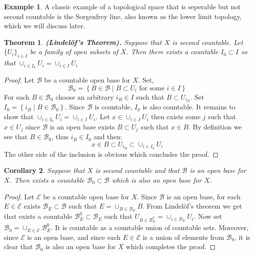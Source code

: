 \documentclass[11pt,a4paper]{article}
\theoremstyle{definition}
\newtheorem{example}{Example}[section]
\theoremstyle{plain}
\newtheorem{theorem}{Theorem}[section]
\newtheorem{corollary}[theorem]{Corollary}
\newcommand{\set}[2]{ \left\{ #1 \mid #2 \right\} }
\renewcommand{\tt}[1]{\textnormal{\textbf{(#1).}}} %
\begin{document}
  \begin{example}
    A classic example of a topological space that is seperable but not
    second countable is the Sorgenfrey line, also known as the lower
    limit topology, which we will discuss later.
  \end{example}

  \begin{theorem}
    \tt{Lindelöf’s Theorem} Suppose that $X$ is second countable. Let
    $\{U_i\}_{i \in I}$ be a family of open subsets of $X$. Then there
    exists a countable $I_0 \subset I$ so that 
    $\cup_{i \in I_{0}}{U_i} = \cup_{i \in I}{U_i}$
  \end{theorem}
  \begin{proof}
    Let $\mathcal{B}$ be a countable open base for $X$. Set,
    \[
      \mathcal{B}_0 = \set{B \in \mathcal{B}}{B \subset U_i
      \text{ for some } i \in I}
    \]
    For each $B \in \mathcal{B}_0$ choose an arbitrary $i_B \in I$ such
    that $B \subset U_{i_B}$. Set $I_0 = \set{i_B}{B \in \mathcal{B}_0}$.
    Since $\mathcal{B}$ is countable, $I_0$ is also countable. It remains
    to show that $\cup_{i \in I_{0}}{U_i} = \cup_{i \in I}{U_i}$. Let
    $x \in \cup_{i \in I}{U_i}$ then exists some $j$ such that $x \in U_j$
    since $\mathcal{B}$ is an open base exists $B \subset U_j$ such that
    $x \in B$. By definition we see that $B \in \mathcal{B}_0$, thus
    $i_B \in I_0$ and then:
    \[
      x \in B \subset U_{i_B} \subset \cup_{i \in I_{0}}{U_i}
    \]
    The other side of the inclusion is obvious which concludes the proof.
  \end{proof}

  \begin{corollary}
    Suppose that $X$ is second countable and that $\mathcal{B}$ is an open
    base for $X$. Then exists a countable $\mathcal{B}_0 \subset \mathcal{B}$ 
    which is also an open base for $X$.
  \end{corollary}
  \begin{proof}
    Let $\mathcal{E}$ be a countable open base for $X$. Since $\mathcal{B}$
    is an open base, for each $E \in \mathcal{E}$ exists 
    $\mathcal{B}_E \subset \mathcal{B}$ such that 
    $E = \cup_{B \in \mathcal{B}_E} B$. From Lindel\"of's theorem
    we get that exists a countable $\mathcal{B}^0_E \subset \mathcal{B}_E$
    such that $U_{B \in \mathcal{B}^0_E} = \cup_{i \in \mathcal{B}_E}{U_i}$.
    Now set $\mathcal{B}_0 = \cup_{E \in \mathcal{E}}{\mathcal{B}^0_E}$.
    It is countable as a countable union of countable sets. Moreover,
    since $\mathcal{E}$ is an open base, and since each $E \in \mathcal{E}$
    is a union of elements from $\mathcal{B}_0$, it is clear that
    $\mathcal{B}_0$ is also an open base for $X$ which completes the proof.
  \end{proof}
\end{document}
